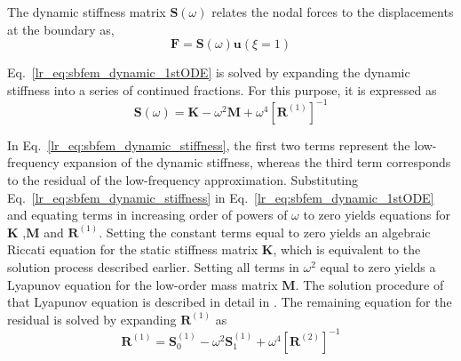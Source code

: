 The dynamic stiffness matrix $\mathbf{S}(\omega)$ relates the nodal forces to the displacements at the boundary as,
\begin{equation}
    \mathbf{F} = \mathbf{S}(\omega) \mathbf{u}(\xi=1)
    \label{lr_eq:sbfem_dynamic_nodal_force}
\end{equation}

Eq.~\ref{lr_eq:sbfem_dynamic_1stODE} is solved by expanding the dynamic stiffness into a series of continued fractions.
For this purpose, it is expressed as
\begin{equation}
    \mathbf{S}(\omega) = \mathbf{K} - \omega^2 \mathbf{M} + \omega^4 \left[
        \mathbf{R}^{(1)}    
    \right]^{-1}
    \label{lr_eq:sbfem_dynamic_stiffness}
\end{equation}

In Eq.~\ref{lr_eq:sbfem_dynamic_stiffness}, the first two terms represent the low-frequency expansion of the dynamic stiffness, whereas the third term corresponds to the residual of the low-frequency approximation.
Substituting Eq.~\ref{lr_eq:sbfem_dynamic_stiffness} in Eq.~\ref{lr_eq:sbfem_dynamic_1stODE} and equating terms in increasing order of powers of $\omega$ to zero yields equations for $\mathbf{K}$ ,$\mathbf{M}$  and $\mathbf{R}^{(1)}$.
Setting the constant terms equal to zero yields an algebraic Riccati equation for the static stiffness matrix $\mathbf{K}$, which is equivalent to the solution process described earlier.
Setting all terms in $\omega^2$ equal to zero yields a Lyapunov equation for the low-order mass matrix $\mathbf{M}$.
The solution procedure of that Lyapunov equation is described in detail in \citep{Son1997}.
The remaining equation for the residual is solved by expanding  $\mathbf{R}^{(1)}$ as
\begin{equation}
    \mathbf{R}^{(1)} = \mathbf{S}_0^{(1)} - \omega^2 \mathbf{S}_1^{(1)} + \omega^4 [\mathbf{R}^{(2)}]^{-1}
    \label{lr_eq:sbfem_dynamic_R}
\end{equation}

